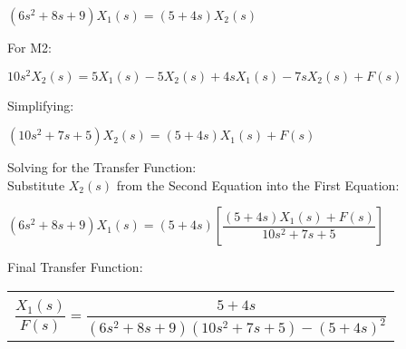 \documentclass[11pt,letterpaper]{article}
\begin{document}
\begin{center}
	$(6s^2+8s+9)X_1(s)=(5+4s)X_2(s)$\\
\end{center}
For M2:\\
\begin{center}
	$10s^2X_2(s)=5X_1(s)-5X_2(s)+4sX_1(s)-7sX_2(s)+F(s)$\\
\end{center}
Simplifying:\\
\begin{center}
	$(10s^2+7s+5)X_2(s)=(5+4s)X_1(s)+F(s)$\\
\end{center}
Solving for the Transfer Function:\\[12pt]
Substitute $X_2(s)$ from the Second Equation into the First Equation:\\
\begin{center}
	$(6s^2+8s+9)X_1(s)=(5+4s)\left[\dfrac{(5+4s)X_1(s)+F(s)}{10s^2+7s+5}\right] $\\
\end{center}
Final Transfer Function:\\
\begin{center}
	\begin{tabular}{|c|}
		\hline \\
		$\dfrac{X_1(s)}{F(s)}=\dfrac{5+4s}{(6s^2+8s+9)(10s^2+7s+5)-(5+4s)^2}$	\\ [12pt]
	\hline
	\end{tabular}	
\end{center}

\clearpage
\end{document}
